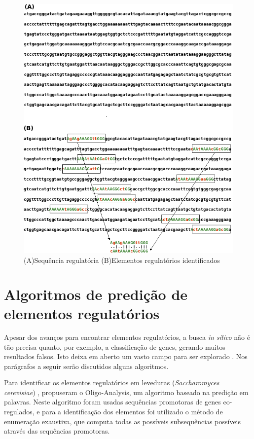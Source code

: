 \begin{figure}[htb!]
    \centering
    \includegraphics[scale=0.7]{./imagens/exe_element.png}
    \caption{(A)Sequência regulatória (B)Elementos regulatórios identificados}
    \label{fig:exe_elemen}
\end{figure}

\section{Algoritmos de predição de elementos regulatórios}

Apesar dos avanços para encontrar elementos regulatórios, a busca \textit{in silico} não é tão precisa quanto, por exemplo, a classificação de genes, gerando muitos resultados falsos. Isto deixa em aberto um vasto campo para ser explorado \cite{Rombauts2003}. Nos parágrafos a seguir serão discutidos alguns algoritmos.

Para identificar os elementos regulatórios em leveduras (\textit{Saccharomyces cerevisiae}) \cite{Helden1998}, propuseram o Oligo-Analysis, um algoritmo baseado na predição em palavras. Neste algoritmo foram usadas sequências promotoras de genes co-regulados, e para a identificação dos elementos foi utilizado o método de enumeração exaustiva, que computa todas as possíveis subsequências possíveis através das sequências promotoras.

